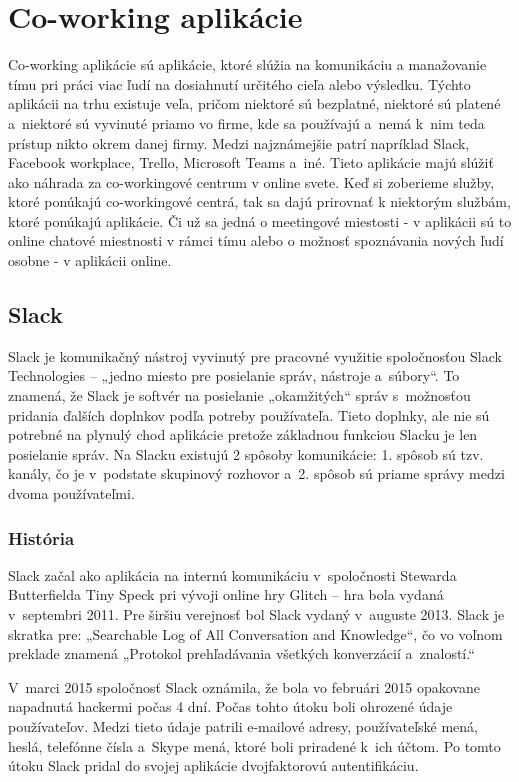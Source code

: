 \section{Co-working aplikácie}
\indent Co-working aplikácie sú aplikácie, ktoré slúžia na komunikáciu a manažovanie tímu pri práci viac ľudí na dosiahnutí určitého cieľa alebo výsledku. Týchto aplikácii na trhu existuje veľa, pričom niektoré sú bezplatné, niektoré sú platené a niektoré sú vyvinuté priamo vo firme, kde sa používajú a nemá k nim teda prístup nikto okrem danej firmy. Medzi najznámejšie patrí napríklad Slack, Facebook workplace, Trello, Microsoft Teams a iné. 
\indent Tieto aplikácie majú slúžiť ako náhrada za co-workingové centrum v online svete. Keď si zoberieme služby, ktoré ponúkajú co-workingové centrá, tak sa dajú prirovnať k niektorým službám, ktoré ponúkajú aplikácie. Či už sa jedná o meetingové miestosti - v aplikácii sú to online chatové miestnosti v rámci tímu alebo o možnosť spoznávania nových ľudí osobne - v aplikácii online. 

\subsection{Slack}
\indent Slack je komunikačný nástroj vyvinutý pre pracovné využitie spoločnosťou Slack Technologies – „jedno miesto pre posielanie správ, nástroje a súbory“. To znamená, že Slack je softvér na posielanie „okamžitých“ správ s možnosťou pridania ďalších doplnkov podľa potreby používateľa. Tieto doplnky, ale nie sú potrebné na plynulý chod aplikácie pretože základnou funkciou Slacku je len posielanie správ. Na Slacku existujú 2 spôsoby komunikácie: 1. spôsob sú tzv. kanály, čo je v podstate skupinový rozhovor a 2. spôsob sú priame správy medzi dvoma používateľmi. 

\subsubsection{História}
\indent Slack začal ako aplikácia na internú komunikáciu v spoločnosti Stewarda Butterfielda Tiny Speck pri vývoji online hry Glitch – hra bola vydaná v septembri 2011. Pre širšiu verejnosť bol Slack vydaný v auguste 2013. Slack je skratka pre: „Searchable Log of All Conversation and Knowledge“, čo vo voľnom preklade znamená „Protokol prehľadávania všetkých konverzácií a znalostí.“

\indent V marci 2015 spoločnosť Slack oznámila, že bola vo februári 2015 opakovane napadnutá hackermi počas 4 dní. Počas tohto útoku boli ohrozené údaje používateľov. Medzi tieto údaje patrili e-mailové adresy, používateľské mená, heslá, telefónne čísla a Skype mená, ktoré boli priradené k ich účtom. Po tomto útoku Slack pridal do svojej aplikácie dvojfaktorovú autentifikáciu. 

